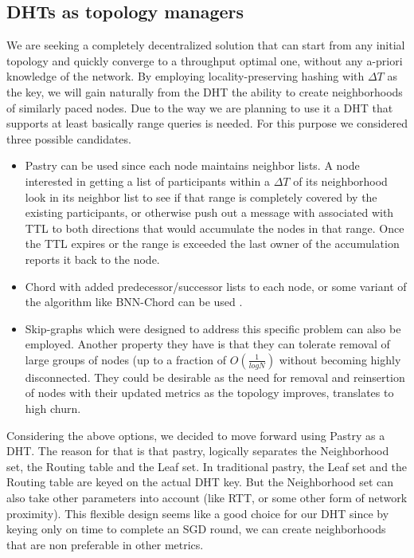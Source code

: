 \documentclass[12pt,notitlepage]{article}
\begin{document}
\subsection{DHTs as topology managers}
We are seeking a completely decentralized solution that can start from any 
initial topology and quickly converge to a throughput optimal one, without
any a-priori knowledge of the network. By employing locality-preserving hashing
with $\Delta T$ as the key, we will gain naturally from the DHT the ability to
create neighborhoods of similarly paced nodes. Due to the way we are planning
to use it a DHT that supports at least basically range queries is needed.
For this purpose we considered three possible candidates. 
\begin{itemize}
\item Pastry can be used since each node maintains neighbor lists. A node 
interested in getting a list of participants within a $\Delta T$ of its
neighborhood look in its neighbor list to see if that range is completely 
covered by the existing participants, or otherwise push out a message with
associated with TTL to both directions that would accumulate the nodes in that
range. Once the TTL expires or the range is exceeded the last owner of the
accumulation reports it back to the node. 

\item Chord with added predecessor/successor lists to each
node, or some variant of the algorithm like BNN-Chord can be used 
\cite{bnn-chord}.

\item Skip-graphs \cite{skip-graphs} which were designed to address this 
specific problem can also be employed. Another property they have is that
they can tolerate removal of large groups of nodes (up to a fraction of 
$O(\frac{1}{log N})$ without becoming highly disconnected. They could be
desirable as the need for removal and reinsertion of nodes with their
updated metrics as the topology improves, translates to high churn.
\end{itemize}

Considering the above options, we decided to move forward using Pastry
as a DHT. The reason for that is that pastry, logically separates
the Neighborhood set, the Routing table and the Leaf set. In traditional
pastry, the Leaf set and the Routing table are keyed on the actual DHT key.
But the Neighborhood set can also take other parameters into account (like RTT,
or some other form of network proximity). This flexible design seems like a good choice
for our DHT since by keying only on time to complete an SGD round, we can create neighborhoods
that are non preferable in other metrics. 
\end{document}
